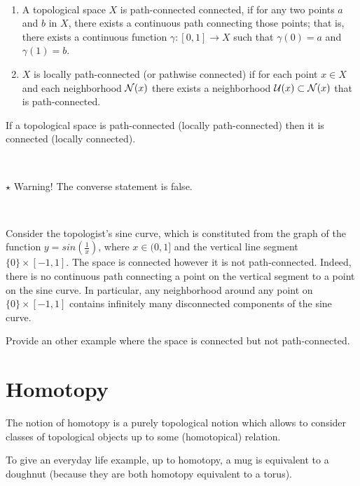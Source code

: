 \begin{definition}
\

\begin{enumerate}
\item A topological space $X$ is path-connected connected, if for any two points $a$ and $b$ in $X$, there exists a continuous path connecting those points; that is, there exists a continuous function $\gamma : [0,1] \to X$ such that $\gamma(0)=a$ and $\gamma(1)=b$.
\item $X$ is locally path-connected (or pathwise connected) if for each point $x\in X$ and each neighborhood $\mathcal{N}(x)$ there exists a neighborhood $\mathcal{U}(x)\subset \mathcal{N}(x)$ that is path-connected.
\end{enumerate}
\end{definition}

\begin{theorem}
If a topological space is path-connected (locally path-connected) then it is connected (locally connected).
\end{theorem}


\, 

$\star$ Warning! The converse statement is false.

\, 

 \begin{example}
Consider the topologist's sine curve, which is constituted from the graph of the function  $y=sin(\frac{1}{x})$, where $x\in (0,1]$ and the vertical line segment $\{0\}\times [-1,1]$. 
The space is connected however it is not path-connected. 
Indeed, there is no continuous path connecting a point on the vertical segment to a point on the sine curve. In particular, any neighborhood around any point on $\{0\}\times [-1,1]$ contains infinitely many disconnected components of the sine curve. 
 \end{example}     
                       
   \begin{ex}\label{Ex:13}
    Provide an other example where the space is connected but not path-connected.  
\end{ex}

\section{Homotopy}
The notion of homotopy is a purely topological notion which allows to consider classes of topological objects up to some (homotopical) relation. 

To give an everyday life example, up to homotopy, a mug is equivalent to a doughnut (because they are both homotopy equivalent to a torus). 

